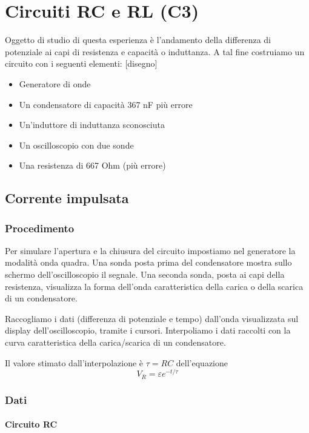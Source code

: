 \chapter{Circuiti RC e RL (C3)}

Oggetto di studio di questa esperienza è l'andamento della differenza di potenziale ai capi di resistenza e capacità o induttanza.
A tal fine costruiamo un circuito con i seguenti elementi:
[disegno]

\begin{itemize}
  \item Generatore di onde
  \item Un condensatore di capacità 367 nF più errore
  \item Un'induttore di induttanza sconosciuta
  \item Un oscilloscopio con due sonde
  \item Una resistenza di 667 Ohm (più errore)
\end{itemize}

\section{Corrente impulsata}
\subsection{Procedimento}


Per simulare l'apertura e la chiusura del circuito impostiamo nel generatore la modalità onda quadra. Una sonda posta prima del condensatore mostra sullo schermo dell'oscilloscopio il segnale.  
Una seconda sonda, posta ai capi della resistenza, visualizza la forma dell'onda caratteristica della carica o della scarica di un condensatore.

Raccogliamo i dati (differenza di potenziale e tempo) dall'onda visualizzata sul display dell'oscilloscopio, tramite i cursori. Interpoliamo i dati raccolti con la curva caratteristica della carica/scarica di un condensatore.

Il valore stimato dall'interpolazione è $\tau=RC$ dell'equazione
$$V_R = \varepsilon e^{-t/\tau}$$

\subsection{Dati}
\subsubsection{Circuito RC}

